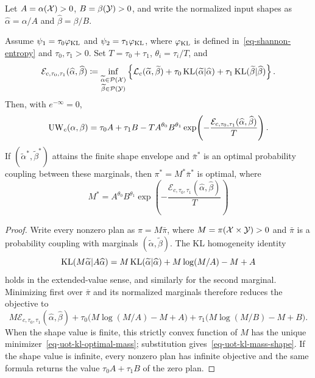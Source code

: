 Let $A=\alpha(\mathcal{X})>0$, $B=\beta(\mathcal{Y})>0$, and write the normalized input shapes as $\widehat\alpha=\alpha/A$ and $\widehat\beta=\beta/B$.

\begin{prop}\label{prop-uot-kl-mass-shape}
	Assume $\psi_1=\tau_0\varphi_{\operatorname{KL}}$ and $\psi_2=\tau_1\varphi_{\operatorname{KL}}$, where $\varphi_{\operatorname{KL}}$ is defined in~\eqref{eq-shannon-entropy} and $\tau_0,\tau_1>0$. Set $T=\tau_0+\tau_1$, $\theta_i=\tau_i/T$, and
	\begin{equation}\label{eq-uot-kl-shape-envelope}
		\mathcal E_{c,\tau_0,\tau_1}(\widehat\alpha,\widehat\beta)
		\coloneqq
		\inf_{\substack{\widetilde\alpha\in\mathcal{P}(\mathcal{X})\\
			\widetilde\beta\in\mathcal{P}(\mathcal{Y})}}
		\left\{
			\mathcal{L}_c(\widetilde\alpha,\widetilde\beta)
			+\tau_0\operatorname{KL}(\widetilde\alpha|\widehat\alpha)
			+\tau_1\operatorname{KL}(\widetilde\beta|\widehat\beta)
		\right\}.
	\end{equation}
	Then, with $e^{-\infty}=0$,
	\begin{equation}\label{eq-uot-kl-mass-shape}
		\operatorname{UW}_c(\alpha,\beta)
		=
		\tau_0A+\tau_1B
		-T A^{\theta_0}B^{\theta_1}
		\exp\!\left(
			-\frac{\mathcal E_{c,\tau_0,\tau_1}(\widehat\alpha,\widehat\beta)}{T}
		\right).
	\end{equation}
	If $(\widetilde\alpha^*,\widetilde\beta^*)$ attains the finite shape envelope and $\bar\pi^*$ is an optimal probability coupling between these marginals, then $\pi^*=M^*\bar\pi^*$ is optimal, where
	\begin{equation}\label{eq-uot-kl-optimal-mass}
		M^*
		=
		A^{\theta_0}B^{\theta_1}
		\exp\!\left(
			-\frac{\mathcal E_{c,\tau_0,\tau_1}(\widehat\alpha,\widehat\beta)}{T}
		\right)
	\end{equation}
\end{prop}

\begin{proof}
	Write every nonzero plan as $\pi=M\bar\pi$, where $M=\pi(\mathcal{X}\times\mathcal{Y})>0$ and $\bar\pi$ is a probability coupling with marginals $(\widetilde\alpha,\widetilde\beta)$. The KL homogeneity identity
	\begin{equation}\label{eq-kl-mass-shape-identity}
		\operatorname{KL}(M\widetilde\alpha|A\widehat\alpha)
		=
		M\operatorname{KL}(\widetilde\alpha|\widehat\alpha)
		+M\log(M/A)-M+A
	\end{equation}
	holds in the extended-value sense, and similarly for the second marginal. Minimizing first over $\bar\pi$ and its normalized marginals therefore reduces the objective to
	\[
		M\mathcal E_{c,\tau_0,\tau_1}(\widehat\alpha,\widehat\beta)
		+\tau_0\big(M\log(M/A)-M+A\big)
		+\tau_1\big(M\log(M/B)-M+B\big).
	\]
	When the shape value is finite, this strictly convex function of $M$ has the unique minimizer~\eqref{eq-uot-kl-optimal-mass}; substitution gives~\eqref{eq-uot-kl-mass-shape}. If the shape value is infinite, every nonzero plan has infinite objective and the same formula returns the value $\tau_0A+\tau_1B$ of the zero plan.
\end{proof}

